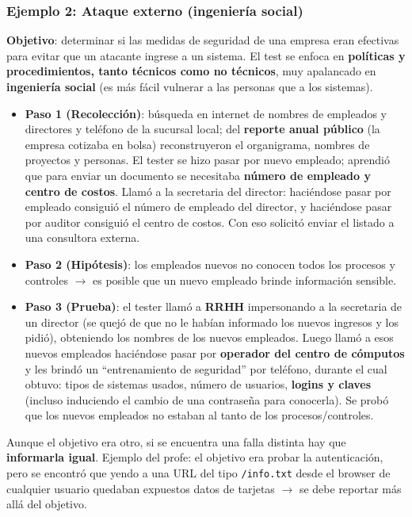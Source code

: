 \documentclass[../main.tex]{subfiles}
\begin{document}
\subsubsection{Ejemplo 2: Ataque externo (ingeniería social)}

\textbf{Objetivo}: determinar si las medidas de seguridad de una empresa eran efectivas para
evitar que un atacante ingrese a un sistema. El test se enfoca en \textbf{políticas y
procedimientos, tanto técnicos como no técnicos}, muy apalancado en \textbf{ingeniería social}
(es más fácil vulnerar a las personas que a los sistemas).

\begin{itemize}
    \item \textbf{Paso 1 (Recolección)}: búsqueda en internet de nombres de empleados y
    directores y teléfono de la sucursal local; del \textbf{reporte anual público} (la empresa
    cotizaba en bolsa) reconstruyeron el organigrama, nombres de proyectos y personas. El tester
    se hizo pasar por nuevo empleado; aprendió que para enviar un documento se necesitaba
    \textbf{número de empleado y centro de costos}. Llamó a la secretaria del director:
    haciéndose pasar por empleado consiguió el número de empleado del director, y haciéndose
    pasar por auditor consiguió el centro de costos. Con eso solicitó enviar el listado a una
    consultora externa.
    \item \textbf{Paso 2 (Hipótesis)}: los empleados nuevos no conocen todos los procesos y
    controles $\rightarrow$ es posible que un nuevo empleado brinde información sensible.
    \item \textbf{Paso 3 (Prueba)}: el tester llamó a \textbf{RRHH} impersonando a la secretaria
    de un director (se quejó de que no le habían informado los nuevos ingresos y los pidió),
    obteniendo los nombres de los nuevos empleados. Luego llamó a esos nuevos empleados haciéndose
    pasar por \textbf{operador del centro de cómputos} y les brindó un ``entrenamiento de
    seguridad'' por teléfono, durante el cual obtuvo: tipos de sistemas usados, número de usuarios,
    \textbf{logins y claves} (incluso induciendo el cambio de una contraseña para conocerla). Se
    probó que los nuevos empleados no estaban al tanto de los procesos/controles.
\end{itemize}

\begin{ojo}
Aunque el objetivo era otro, si se encuentra una falla distinta hay que \textbf{informarla
igual}. Ejemplo del profe: el objetivo era probar la autenticación, pero se encontró que
yendo a una URL del tipo \texttt{/info.txt} desde el browser de cualquier usuario quedaban
expuestos datos de tarjetas $\rightarrow$ se debe reportar más allá del objetivo.
\end{ojo}
\end{document}
